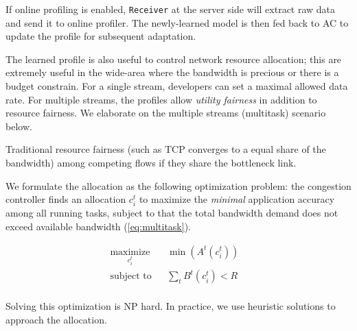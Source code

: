 If online profiling is enabled, \texttt{Receiver} at the server side will
extract raw data and send it to online profiler. The newly-learned model is then
fed back to AC to update the profile for subsequent adaptation.

%     

 The learned profile is also useful to control
network resource allocation; this are extremely useful in the wide-area where
the bandwidth is precious or there is a budget constrain. For a single stream,
developers can set a maximal allowed data rate. For multiple streams, the
profiles allow \textit{utility fairness} in addition to resource fairness. We
elaborate on the multiple streams (multitask) scenario below.

Traditional resource fairness (such as TCP converges to a equal share of the
bandwidth) among competing flows if they share the bottleneck link.


We formulate the allocation as the following optimization problem: the
congestion controller finds an allocation $c_i^t$ to maximize the
\textit{minimal} application accuracy among all running tasks, subject to that
the total bandwidth demand does not exceed available bandwidth
(\autoref{eq:multitask}).

\begin{equation}
  \label{eq:multitask}
  \begin{aligned}
    & \underset{c_i^t}{\text{maximize}} & & \min({A^t(c_i^t)}) & & \\
    & \text{subject to} & & \sum_t{B^t(c_i^t)} < R & & \\
  \end{aligned}
\end{equation}

Solving this optimization is NP hard. In practice, we use heuristic solutions to
approach the allocation.

